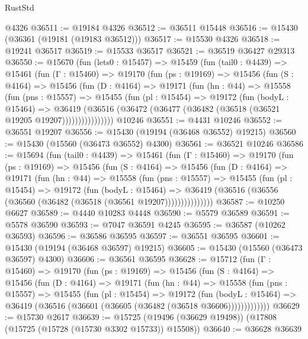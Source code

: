 \begin{lexlean}{RustStd}
\begin{coremodule}
{\begin{coremodule}
{{{{{{{{{{{{{{{{{{{{{{{{{{{{{{{{{{{{{{{{{{{{{{{{{{{{{{{{{{{{    @4326
@36511 := @19184 @4326
@36512 := @36511 @15448
@36516 := @15430 (@36361 (@19181 (@19183 @36512)))
@36517 := @15530 @4326
@36518 := @19241 @36517
@36519 := @15533 @36517
@36521 := @36519 @36427 @29313
@36550 := @15670
    (fun (lets0 : @15457) =>
    @15459
      (fun (tail0 : @4439) =>
      @15461
        (fun (Γ : @15460) =>
        @19170
          (fun (ps : @19169) =>
          @15456
            (fun (S : @4164) =>
            @15456
              (fun (D : @4164) =>
              @19171
                (fun (hn : @44) =>
                @15558
                  (fun (pns : @15557) =>
                  @15455
                    (fun (pl : @15454) =>
                    @19172
                      (fun (bodyL : @15464) =>
                      @36419
                        (@36516
                          (@36472 (@36477 (@36482 (@36518 (@36521 @19205 @19207))))))))))))))))
    @10246
@36551 := @4431 @10246
@36552 := @36551 @19207
@36556 := @15430 (@19194 (@36468 @36552) @19215)
@36560 := @15430 (@15560 (@36473 @36552) @4300)
@36561 := @36521 @10246
@36586 := @15694
    (fun (tail0 : @4439) =>
    @15461
      (fun (Γ : @15460) =>
      @19170
        (fun (ps : @19169) =>
        @15456
          (fun (S : @4164) =>
          @15456
            (fun (D : @4164) =>
            @19171
              (fun (hn : @44) =>
              @15558
                (fun (pns : @15557) =>
                @15455
                  (fun (pl : @15454) =>
                  @19172
                    (fun (bodyL : @15464) =>
                    @36419 (@36516 (@36556 (@36560 (@36482 (@36518 (@36561 @19207)))))))))))))))
@36587 := @10250 @6627
@36589 := @4440 @10283 @4448
@36590 := @5579 @36589
@36591 := @5578 @36590
@36593 := @7047 @36591 @4245
@36595 := @36587 (@10262 @36593)
@36596 := @36586 @36595
@36597 := @36551 @36595
@36601 := @15430 (@19194 (@36468 @36597) @19215)
@36605 := @15430 (@15560 (@36473 @36597) @4300)
@36606 := @36561 @36595
@36628 := @15712
    (fun (Γ : @15460) =>
    @19170
      (fun (ps : @19169) =>
      @15456
        (fun (S : @4164) =>
        @15456
          (fun (D : @4164) =>
          @19171
            (fun (hn : @44) =>
            @15558
              (fun (pns : @15557) =>
              @15455
                (fun (pl : @15454) =>
                @19172
                  (fun (bodyL : @15464) =>
                  @36419 (@36516 (@36601 (@36605 (@36482 (@36518 @36606)))))))))))))
@36629 := @15730 @2617
@36639 := @15725 (@19496 (@36629 @19498)) (@17808 (@15725 (@15728 (@15730 @3302 @15733)) @15508))
@36640 := @36628 @36639
}}}}}}}}}}}}}}}}}}}}}}}}}}}}}}}}}}}}}}}}}}}}}}}}}}}}}}}}}}}}
\end{coremodule}}
\end{coremodule}
\end{lexlean}
